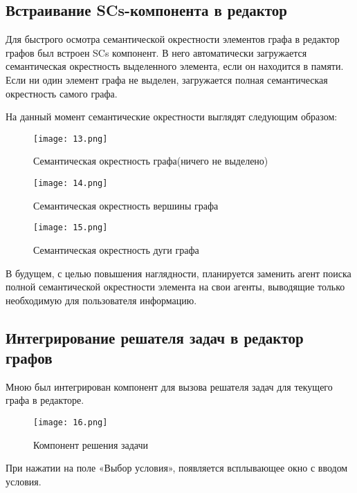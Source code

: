 \newpage
\subsection{Встраивание SCs-компонента в редактор}

Для быстрого осмотра семантической окрестности элементов графа в редактор графов был встроен SCs компонент. В него автоматически загружается семантическая окрестность выделенного элемента, если он находится в памяти. Если ни один элемент графа не выделен, загружается полная семантическая окрестность самого графа.

На данный момент семантические окрестности выглядят следующим образом:

\begin{figure}[H]
  \centering
  \texttt{[image: 13.png]}
  \caption{Семантическая окрестность графа(ничего не выделено)}
  \label{fig:hardware:sdr_pipeline}
\end{figure}

\begin{figure}[H]
  \centering
  \texttt{[image: 14.png]}
  \caption{Семантическая окрестность вершины графа}
  \label{fig:hardware:sdr_pipeline}
\end{figure}

\begin{figure}[H]
  \centering
  \texttt{[image: 15.png]}
  \caption{Семантическая окрестность дуги графа}
  \label{fig:hardware:sdr_pipeline}
\end{figure}


В будущем, с целью повышения наглядности, планируется заменить агент поиска полной семантической окрестности элемента на свои агенты, выводящие только необходимую для пользователя информацию.

\newpage
\subsection{Интегрирование решателя задач в редактор графов}

Мною был интегрирован компонент для вызова решателя задач для текущего графа в редакторе.

\begin{figure}[H]
  \centering
  \texttt{[image: 16.png]}
  \caption{Компонент решения задачи}
  \label{fig:hardware:sdr_pipeline}
\end{figure}

При нажатии на поле «Выбор условия», появляется всплывающее окно с вводом условия.

